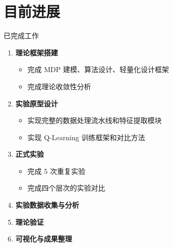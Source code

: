 \documentclass[aspectratio=169, 10pt]{beamer}
\begin{document}
\section{目前进展}
\chapterframe

\begin{frame}{已完成工作}
\begin{enumerate}
    \item \textbf{理论框架搭建} \checkmark
    \begin{itemize}
        \item 完成 MDP 建模、算法设计、轻量化设计框架
        \item 完成理论收敛性分析
    \end{itemize}
    
    \item \textbf{实验原型设计} \checkmark
    \begin{itemize}
        \item 实现完整的数据处理流水线和特征提取模块
        \item 实现 Q-Learning 训练框架和对比方法
    \end{itemize}
    
    \item \textbf{正式实验} \checkmark
    \begin{itemize}
        \item 完成 5 次重复实验
        \item 完成四个层次的实验对比
    \end{itemize}
    
    \item \textbf{实验数据收集与分析} \checkmark
    
    \item \textbf{理论验证} \checkmark
    
    \item \textbf{可视化与成果整理} \checkmark
\end{enumerate}
\end{frame}
\end{document}
